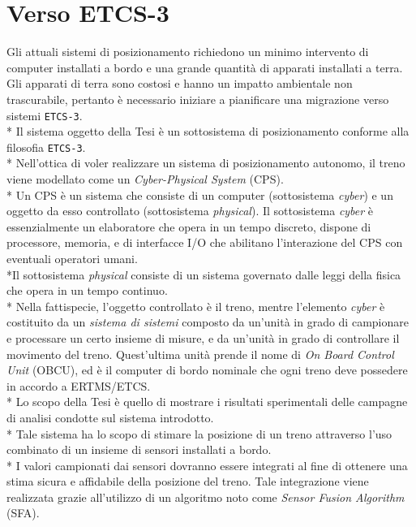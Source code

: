 \section{Verso ETCS-3}
Gli attuali sistemi di posizionamento richiedono un minimo intervento di computer installati a bordo e una grande quantit\`a di apparati installati a terra. Gli apparati di terra sono costosi e hanno un impatto ambientale non trascurabile, pertanto \`e necessario iniziare a pianificare una migrazione verso sistemi \texttt{ETCS-3}.\cite{market}\\*
Il sistema oggetto della Tesi \`e un sottosistema di posizionamento conforme alla filosofia \texttt{ETCS-3}.\\*
Nell'ottica di voler realizzare un sistema di posizionamento autonomo, il treno viene modellato come un \emph{Cyber-Physical System} (CPS).\\*
Un CPS \`e un sistema che consiste di un computer (sottosistema \emph{cyber}) e un oggetto da esso controllato (sottosistema \emph{physical}).
Il sottosistema \emph{cyber} \`e essenzialmente un elaboratore che opera in un tempo discreto, dispone di processore, memoria, e di interfacce I/O che abilitano l'interazione del CPS con eventuali operatori umani.\\*Il sottosistema \emph{physical} consiste di un sistema governato dalle leggi della fisica che opera in un tempo continuo.
\cite{cps}\cite{cecca}\\*
Nella fattispecie, l'oggetto controllato \`e il treno, mentre l'elemento \emph{cyber} \`e costituito da un \emph{sistema di sistemi} composto da un'unit\`a in grado di campionare e processare un certo insieme di misure, e da un'unit\`a in grado di controllare il movimento del treno. Quest'ultima unit\`a prende il nome di \emph{On Board Control Unit} (OBCU), ed \`e il computer di bordo nominale che ogni treno deve possedere in accordo a ERTMS/ETCS.\\*
Lo scopo della Tesi \`e quello di mostrare i risultati sperimentali delle campagne di analisi condotte sul sistema introdotto.\\*
Tale sistema ha lo scopo di stimare la posizione di un treno attraverso l'uso combinato di un insieme di sensori installati a bordo.\\*
I valori campionati dai sensori dovranno essere integrati al fine di ottenere una stima sicura e affidabile della posizione del treno. Tale integrazione viene realizzata grazie all'utilizzo di un algoritmo noto come \emph{Sensor Fusion Algorithm} (SFA). \cite{sfarailway} 